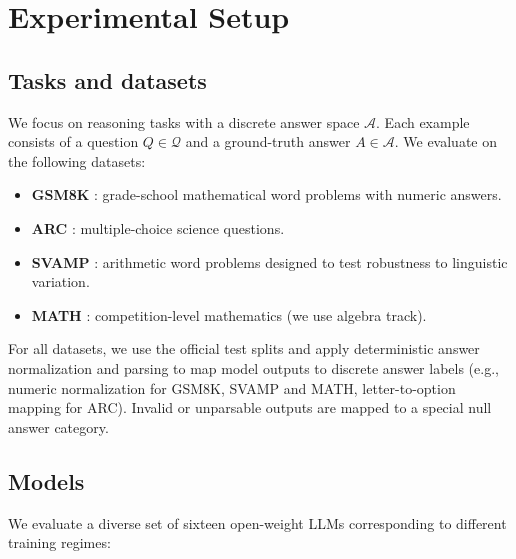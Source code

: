 \documentclass{article}
\begin{document}
\appendix
\section{Experimental Setup}
\label{sec:experimental_setup}

\subsection{Tasks and datasets}
\label{sec:datasets}

We focus on reasoning tasks with a discrete answer space \(\mathcal{A}\). Each example consists of a question \(Q \in \mathcal{Q}\) and a ground-truth answer \(A \in \mathcal{A}\). We evaluate on the following datasets:

\begin{itemize}
\item \textbf{GSM8K} \cite{cobbe2021trainingverifierssolvemath}: grade-school mathematical word problems with numeric answers.
\item \textbf{ARC} \cite{clark2018thinksolvedquestionanswering}: multiple-choice science questions.
\item \textbf{SVAMP} \cite{patel2021nlpmodelsreallyable}: arithmetic word problems designed to test robustness to linguistic variation.
\item \textbf{MATH} \cite{hendrycks2021measuringmathematicalproblemsolving}: competition-level mathematics (we use algebra track).
\end{itemize}

For all datasets, we use the official test splits and apply deterministic answer normalization and parsing to map model outputs to discrete answer labels (e.g., numeric normalization for GSM8K, SVAMP and MATH, letter-to-option mapping for ARC). Invalid or unparsable outputs are mapped to a special null answer category.

\subsection{Models}
\label{sec:models}

We evaluate a diverse set of sixteen open-weight LLMs corresponding to different training regimes:
\end{document}
